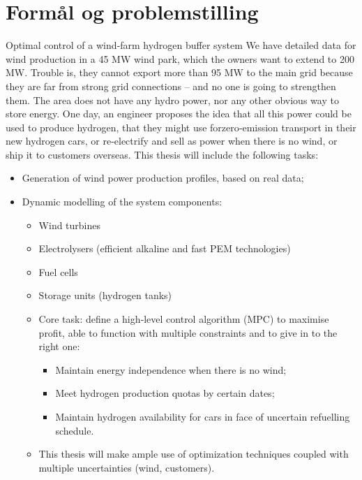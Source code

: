     


    \section{Formål og problemstilling}
    Optimal control of a wind‐farm hydrogen buffer system
    We have detailed data for wind production in a 45 MW wind park, which the owners want to extend
    to 200 MW. Trouble is, they cannot export more than 95 MW to the main grid because they are far
    from strong grid connections – and no one is going to strengthen them. The area does not have any
    hydro power, nor any other obvious way to store energy.
    One day, an engineer proposes the idea that all this power could be used to produce hydrogen, that
    they might use forzero‐emission transport in their new hydrogen cars, or re‐electrify and sell as power
    when there is no wind, or ship it to customers overseas.
    This thesis will include the following tasks:
    \begin{itemize}
        \item Generation of wind power production profiles, based on real data;
        \item Dynamic modelling of the system components:
        \begin{itemize}
            \item Wind turbines
            \item Electrolysers (efficient alkaline and fast PEM technologies)
            \item Fuel cells
            \item Storage units (hydrogen tanks)
        \end{itemize}
        \begin{itemize}
            \item Core task: define a high‐level control algorithm (MPC) to maximise profit, able to function with
    multiple constraints and to give in to the right one:
        \begin{itemize}
            \item Maintain energy independence when there is no wind;
            \item Meet hydrogen production quotas by certain dates;
            \item Maintain hydrogen availability for cars in face of uncertain refuelling schedule.
        \end{itemize}
        \item This thesis will make ample use of optimization techniques coupled with multiple uncertainties (wind,
    customers).
    
        \end{itemize}
        
    \end{itemize}
     
